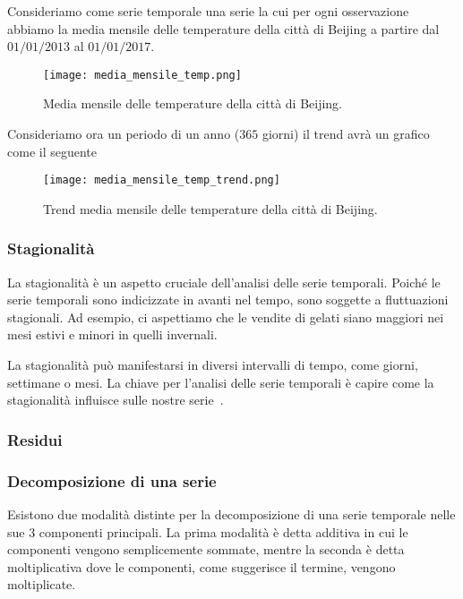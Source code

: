 \begin{esempio} 
    Consideriamo come serie temporale una serie la cui per ogni osservazione abbiamo
    la media mensile delle temperature della città di Beijing a partire 
    dal $01/01/2013$ al $01/01/2017$.

    \begin{figure}[H]
        \centering
        \texttt{[image: media\_mensile\_temp.png]}
        \caption{Media mensile delle temperature della città di Beijing.}
    \end{figure}

    Consideriamo ora un periodo di un anno ($365$ giorni) il trend avrà un grafico
    come il seguente

    \begin{figure}[H]
        \centering
        \texttt{[image: media\_mensile\_temp\_trend.png]}
        \caption{Trend media mensile delle temperature della città di Beijing.}
        \label{fig:media_mensile_temp_trend}
    \end{figure}

\end{esempio}


\subsubsection{Stagionalità}
La stagionalità è un aspetto cruciale dell'analisi delle serie temporali. 
Poiché le serie temporali sono indicizzate in avanti nel tempo, sono soggette a 
fluttuazioni stagionali. Ad esempio, ci aspettiamo che le vendite di gelati siano 
maggiori nei mesi estivi e minori in quelli invernali.

La stagionalità può manifestarsi in diversi intervalli di tempo, 
come giorni, settimane o mesi. La chiave per l'analisi delle serie temporali 
è capire come la stagionalità influisce sulle nostre serie~\cite{md:seasonality}.


\subsubsection{Residui}



\subsubsection{Decomposizione di una serie}
Esistono due modalità distinte per la decomposizione di
una serie temporale nelle sue 3 componenti principali. La prima modalità è detta
additiva in cui le componenti vengono semplicemente sommate, mentre la seconda
è detta moltiplicativa dove le componenti, come suggerisce il termine, 
vengono moltiplicate.

